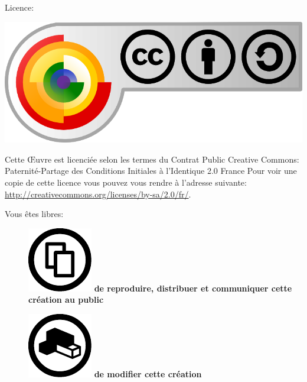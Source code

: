 \bigskip
\begin{center}

Licence:

\includegraphics[scale=0.4]{images/CC-BY-SA.png}\\ 

\end{center}


Cette Œuvre est licenciée selon les termes du Contrat Public Creative Commons: 
Paternité-Partage des Conditions Initiales à l'Identique 2.0 France
Pour voir une copie de cette licence vous pouvez vous rendre à l'adresse suivante:
\url{http://creativecommons.org/licenses/by-sa/2.0/fr/}.

\bigskip

Vous êtes libres:
\begin{description}

\item[] \includegraphics[scale=0.2]{images/Share.pdf}\bf{} de reproduire\rm, distribuer et communiquer cette création au public
\item[] \includegraphics[scale=0.2]{images/remix.pdf}\bf{} de modifier\rm{} cette création
\end{description}

